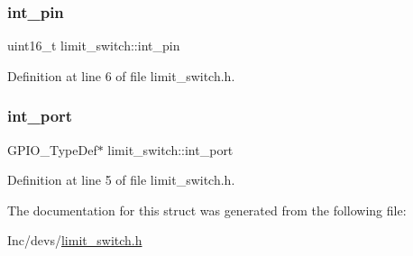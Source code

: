 \subsubsection{\texorpdfstring{int\_pin}{int\_pin}}
{\footnotesize\ttfamily uint16\+\_\+t limit\+\_\+switch\+::int\+\_\+pin}



Definition at line 6 of file limit\+\_\+switch.\+h.

\mbox{\label{structlimit__switch_af6b264126ee9bb617adac15907978946}} 
\subsubsection{\texorpdfstring{int\_port}{int\_port}}
{\footnotesize\ttfamily G\+P\+I\+O\+\_\+\+Type\+Def$\ast$ limit\+\_\+switch\+::int\+\_\+port}



Definition at line 5 of file limit\+\_\+switch.\+h.



The documentation for this struct was generated from the following file\+:\begin{DoxyCompactItemize}
\item 
Inc/devs/\mbox{\hyperlink{limit__switch_8h}{limit\+\_\+switch.\+h}}\end{DoxyCompactItemize}

